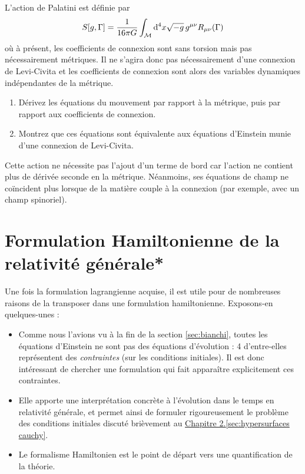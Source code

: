 \begin{exerc}
    L'action de Palatini est définie par
    \begin{align}
        S[g,\Gamma] = \frac{1}{16\pi G} \int_{\mathcal{M}} \mathrm{d}^4 x \sqrt{-g} \, g^{\mu\nu} R_{\mu\nu}(\Gamma)
    \end{align}
    où à présent, les coefficients de connexion sont sans torsion mais pas nécessairement métriques. Il ne s'agira donc pas nécessairement d'une connexion de Levi-Civita et les coefficients de connexion sont alors des variables dynamiques indépendantes de la métrique.
    \begin{enumerate}[label = (\roman*).]
        \item Dérivez les équations du mouvement par rapport à la métrique, puis par rapport aux coefficients de connexion.
        \item Montrez que ces équations sont équivalente aux équations d'Einstein munie d'une connexion de Levi-Civita.
    \end{enumerate}
    Cette action ne nécessite pas l'ajout d'un terme de bord car l'action ne contient plus de dérivée seconde en la métrique. Néanmoins, ses équations de champ ne coïncident plus lorsque de la matière couple à la connexion (par exemple, avec un champ spinoriel).
\end{exerc}
\section{Formulation Hamiltonienne de la relativité générale*}
Une fois la formulation lagrangienne acquise, il est utile pour de nombreuses raisons de la transposer dans une formulation hamiltonienne. Exposons-en quelques-unes :
\begin{itemize}
    \item Comme nous l'avions vu à la fin de la section \ref{sec:bianchi}, toutes les équations d'Einstein ne sont pas des équations d'évolution : 4 d'entre-elles représentent des \emph{contraintes} (sur les conditions initiales). Il est donc intéressant de chercher une formulation qui fait apparaître explicitement ces contraintes.
    \item Elle apporte une interprétation concrète à l'évolution dans le temps en relativité générale, et permet ainsi de formuler rigoureusement le problème des conditions initiales discuté brièvement au \hyperref[sec:hypersurfaces cauchy]{Chapitre 2.\ref*{sec:hypersurfaces cauchy}}.
    \item Le formalisme Hamiltonien est le point de départ vers une quantification de la théorie.
\end{itemize}
